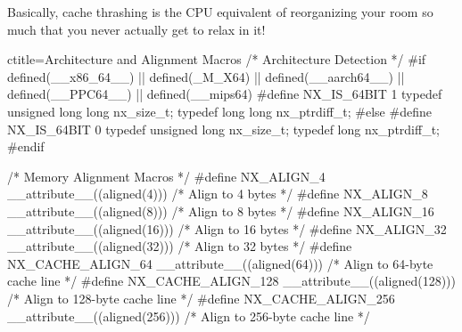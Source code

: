 \begin{NexMainBox}
	\begin{NexMainBox}[dark, crnA, title=\textbf{How to Fix It?}]
		\begin{NexListDark}
		\end{NexListDark}
	\end{NexMainBox}
	\begin{NexMainBox}
		Basically, cache thrashing is the CPU equivalent of reorganizing your room so much that you never actually get to relax in it!
	\end{NexMainBox}
\end{NexMainBox}

\begin{NexCodeBox}{c}{title={Architecture and Alignment Macros}}
/* Architecture Detection */
#if defined(__x86_64__) || defined(_M_X64) || defined(__aarch64__) || defined(__PPC64__) || defined(__mips64)
	#define NX_IS_64BIT 1
	typedef unsigned long long nx_size_t;
	typedef long long nx_ptrdiff_t;
#else
	#define NX_IS_64BIT 0
	typedef unsigned long nx_size_t;
	typedef long nx_ptrdiff_t;
#endif

/* Memory Alignment Macros */
#define NX_ALIGN_4 __attribute__((aligned(4)))   /* Align to 4 bytes */
#define NX_ALIGN_8 __attribute__((aligned(8)))   /* Align to 8 bytes */
#define NX_ALIGN_16 __attribute__((aligned(16))) /* Align to 16 bytes */
#define NX_ALIGN_32 __attribute__((aligned(32))) /* Align to 32 bytes */
#define NX_CACHE_ALIGN_64 __attribute__((aligned(64))) /* Align to 64-byte cache line */
#define NX_CACHE_ALIGN_128 __attribute__((aligned(128))) /* Align to 128-byte cache line */
#define NX_CACHE_ALIGN_256 __attribute__((aligned(256))) /* Align to 256-byte cache line */
\end{NexCodeBox}

\newpage
